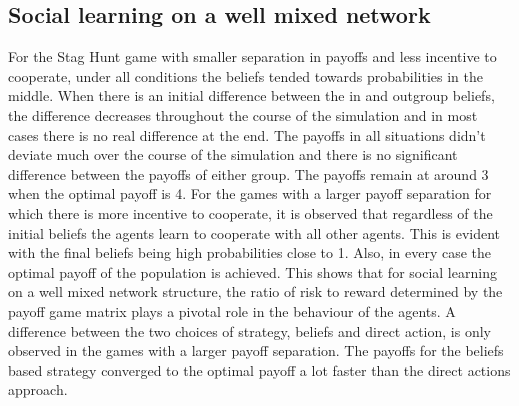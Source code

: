 \documentclass[]{llncs}
\begin{document}
\subsection{Social learning on a well mixed network}
For the Stag Hunt game with smaller separation in payoffs and less incentive to cooperate, under all conditions the beliefs tended towards probabilities in the middle. When there is an initial difference between the in and outgroup beliefs, the difference decreases throughout the course of the simulation and in most cases there is no real difference at the end. The payoffs in all situations didn’t deviate much over the course of the simulation and there is no significant difference between the payoffs of either group. The payoffs remain at around 3 when the optimal payoff is 4.
For the games with a larger payoff separation for which there is more incentive to cooperate, it is observed that regardless of the initial beliefs the agents learn to cooperate with all other agents. This is evident with the final beliefs being high probabilities close to 1. Also, in every case the optimal payoff of the population is achieved. This shows that for social learning on a well mixed network structure, the ratio of risk to reward determined by the payoff game matrix plays a pivotal role in the behaviour of the agents. A difference between the two choices of strategy, beliefs and direct action, is only observed in the games with a larger payoff separation. The payoffs for the beliefs based strategy converged to the optimal payoff a lot faster than the direct actions approach. 
\end{document}
